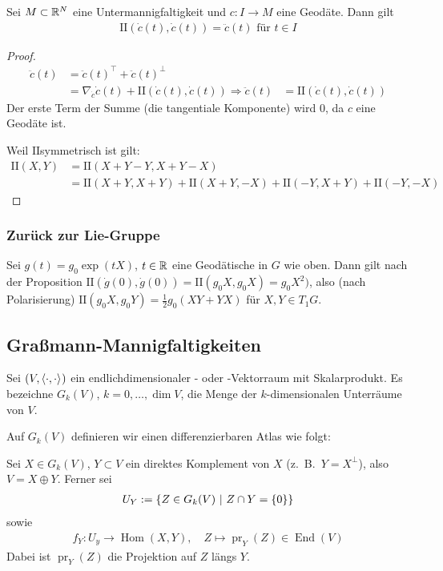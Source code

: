 \documentclass{skript}
\begin{document}
\newcommand{\zwei}{\ensuremath{\mathrm{I\!I}}}
\begin{prp}
  Sei $M\subset\mathbb{R}^N$ eine Untermannigfaltigkeit und $c:I\to M$ eine Geodäte.
  Dann gilt
  \begin{align*}
    \zwei(\dot c(t), \dot c(t)) = \ddot c(t) \text{ für } t\in I
  \end{align*}
  \begin{proof}
    \begin{align*}
      \ddot c(t) &= \ddot c(t)^\top + \ddot c(t)^\perp \\
      &= \nabla_{\dot c}\dot c(t) + \zwei(\dot c(t), \dot c(t))
      \Rightarrow \ddot c(t) &= \zwei(\dot c(t), \dot c(t))
    \end{align*}
    Der erste Term der Summe (die tangentiale Komponente) wird $0$, da $c$ eine
    Geodäte ist.

    Weil \zwei symmetrisch ist gilt:
    \begin{align*}
      \zwei(X,Y) &= \zwei(X+Y-Y, X+Y-X) \\
                 &= \zwei(X+Y,X+Y) + \zwei(X+Y, -X) + \zwei(-Y,X+Y) +
                 \zwei(-Y,-X)
    \end{align*}
  \end{proof}
\end{prp}

\subsubsection*{Zurück zur Lie-Gruppe}
Sei $g(t) = g_0\exp(tX)$, $t\in\mathbb{R}$ eine Geodätische in $G$ wie oben. Dann gilt
nach der Proposition $\zwei(\dot g(0), \dot g(0)) = \zwei(g_0X,g_0X) = g_0X^2)$,
also (nach Polarisierung) $\zwei(g_0X,g_0Y) = \frac{1}{2}g_0(XY+YX)$ für
$X,Y\in T_1G$.

\subsection{Graßmann-Mannigfaltigkeiten}
Sei $(V,\sprod{\cdot,\cdot})$ ein endlichdimensionaler \R- oder \C-Vektorraum
mit Skalarprodukt. Es bezeichne $G_k(V)$, $k = 0,\ldots,\dim V$,  die Menge der
$k$-dimensionalen Unterräume von $V$.

Auf $G_k(V)$ definieren wir einen differenzierbaren Atlas wie folgt:

Sei $X\in G_k(V)$, $Y\subset V$ ein direktes Komplement von $X$ (z.~B.\
$Y=X^\perp$), also $V = X \oplus Y$. Ferner sei
\begin{align*}
  U_Y := \mdef[Z\in G_k(V)]{Z \cap Y = \mdef{0}}
\end{align*}
sowie
\begin{align*}
  f_Y : U_y \to \operatorname{Hom}(X, Y), \quad Z\mapsto \operatorname{pr}_Y(Z)
  \in \operatorname{End}(V)
\end{align*}
Dabei ist $\operatorname{pr}_Y(Z)$ die Projektion auf $Z$ längs $Y$.
\end{document}
